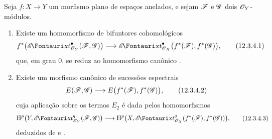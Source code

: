 \begin{proposition}[12.3.4]
\label{0.12.3.4}
Seja $f:X\to Y$ um morfismo plano de espaços anelados, e sejam
$\mathscr{F}$ e $\mathscr{G}$ dois $\mathscr{O}_Y$-módulos.
\begin{enumerate}
  \item[\rm(i)] Existe um homomorfismo de bifuntores cohomológicos
  \[
    f^*\bigl(\shExt^\bullet_{\sh{O}_Y}(\sh{F},\sh{G})\bigr)
    \longrightarrow
    \shExt^\bullet_{\sh{O}_X}
      \bigl(f^*(\sh{F}),f^*(\sh{G})\bigr),
    \tag{12.3.4.1}
    \label{0.12.3.4.1}
  \]
  que, em grau $0$, se reduz ao homomorfismo canônico
  .

  \item[\rm(ii)] Existe um morfismo canônico de sucessões espectrais
  \[
    E(\sh{F},\sh{G})
    \longrightarrow E\bigl(f^*(\sh{F}),f^*(\sh{G})\bigr),
    \tag{12.3.4.2}
    \label{0.12.3.4.2}
  \]
  cuja aplicação sobre os termos $E_2$ é dada pelos homomorfismos
  \[
    \begin{aligned}
    \HH^p\bigl(Y,\shExt^q_{\sh{O}_Y}(\sh{F},\sh{G})\bigr)
    \longrightarrow
    \HH^p\bigl(X,\shExt^q_{\sh{O}_X}
      (f^*(\sh{F}),f^*(\sh{G}))\bigr),
    \end{aligned}
    \tag{12.3.4.3}
    \label{0.12.3.4.3}
  \]
  deduzidos de  e .
\end{enumerate}
\end{proposition}

